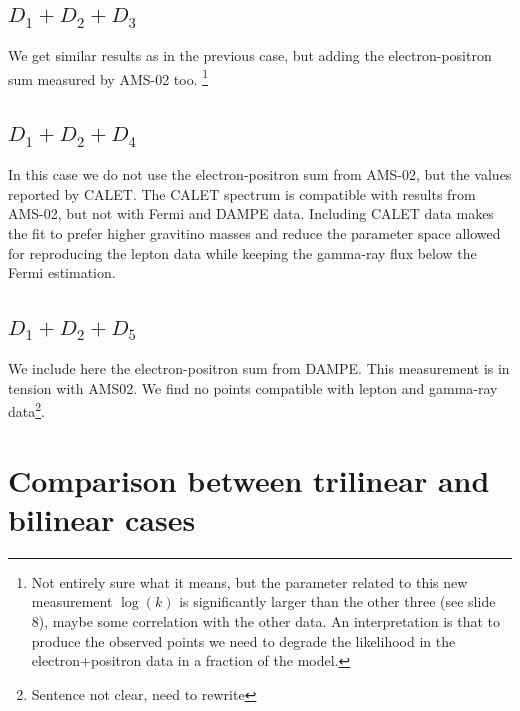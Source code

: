 \documentclass[a4paper,11pt]{article}
\begin{document}

\subsection{$D_1 + D_2 + D_3$}

We get similar results as in the previous case, but adding the electron-positron sum measured by AMS-02 too. \footnote{Not entirely sure what it means, but the parameter related to this new measurement $\log(k)$ is significantly larger than the other three (see slide 8), maybe some correlation with the other data. An interpretation is that to produce the observed points we need to degrade the likelihood in the electron+positron data in a fraction of the model.}

\subsection{$D_1 + D_2 + D_4$}

In this case we do not use the electron-positron sum from AMS-02, but the values reported by CALET. The CALET spectrum is compatible with results from AMS-02, but not with Fermi and DAMPE data. Including CALET data makes the fit to prefer higher gravitino masses and reduce the parameter space allowed for reproducing the lepton data while keeping the gamma-ray flux below the Fermi estimation.


\subsection{$D_1 + D_2 + D_5$}
We include here the electron-positron sum from DAMPE. This measurement is in tension with AMS02. We find no points compatible with lepton and gamma-ray data\footnote{Sentence not clear, need to rewrite}.

\section{Comparison between trilinear and bilinear cases}
\label{sec:comparison}
\end{document}
